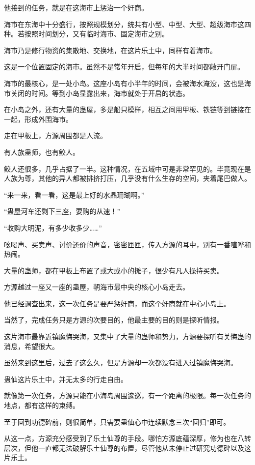 \begin{this_body}
他接到的任务，就是在这海市上惩治一个奸商。

海市在东海中十分盛行，按照规模划分，统共有小型、中型、大型、超级海市这四种。若按照时间划分，又有临时海市、固定海市之别。

海市乃是修行物资的集散地、交换地，在这片乐土中，同样有着海市。

这是一个位置固定的海市。虽然不是常年开启，但每年的大半时间都敞开门扉。

海市的最核心，是一处小岛。这座小岛有小半年的时间，会被海水淹没，这也是海市关闭的时间。等到小岛显露出来，海市就处于开启的状态。

在小岛之外，还有大量的蛊屋，多是船只模样，相互之间用甲板、铁链等到链接在一起，形成外围海市。

走在甲板上，方源周围都是人流。

有人族蛊师，也有鲛人。

鲛人还很多，几乎占据了一半。这种情况，在五域中可是非常罕见的。毕竟现在是人族为尊，其他的异人都被排挤打压，几乎没有什么生存的空间，夹着尾巴做人。

“来一来，看一看，这是最上好的水晶珊瑚啊。”

“蛊屋河车还剩下三座，要购的从速！”

“收购大明泥，有多少收多少……”

吆喝声、买卖声、讨价还价的声音，密密匝匝，传入方源的耳中，别有一番喧哗和热闹。

大量的蛊师，都在甲板上布置了或大或小的摊子，很少有凡人操持买卖。

方源越过一座又一座的蛊屋，朝海市最中央的核心小岛走去。

他已经调查出来，这一次任务是要严惩奸商，而这个奸商就在中心小岛上。

当然了，完成任务只是方源的次要目的，他最主要的目的则是探听情报。

这片海市最靠近镇魔悔哭海，又集中了大量的蛊师和势力，方源要探听有关悔蛊的消息，希望很大。

虽然来到这里后，过去了这么久，但是方源却一次都没有进入过镇魔悔哭海。

蛊仙这片乐土中，并无太多的行走自由。

就像第一次任务，方源只能在小海岛周围逡巡，有一个距离的极限。每一次任务的地点，都有这样的束缚。

至于回到功德碑前，则很简单，只需要蛊仙心中连续默念三次“回归”即可。

从这一点，方源充分感受到了乐土仙尊的手段。哪怕方源底蕴深厚，修为也在八转层次，但他一直都无法破解乐土仙尊的布置，尽管他从未停止过研究功德碑以及这片乐土。


\end{this_body}
